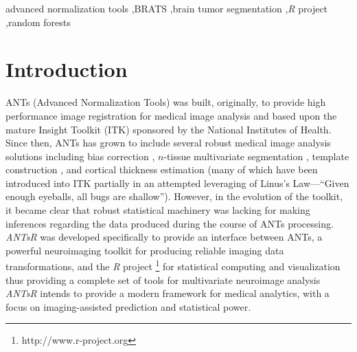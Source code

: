\documentclass[final,5p,times,twocolumn]{elsarticle}
\begin{document}
\begin{frontmatter}
\begin{keyword}
advanced normalization tools \sep BRATS \sep brain tumor segmentation \sep \textit{R} project \sep random forests
\end{keyword}

\end{frontmatter}

%
%
\newpage







%
%
%

\section{Introduction}

ANTs (Advanced Normalization Tools) was built, originally, to provide 
high performance image registration for medical image analysis
\citep{avants2008a} and based upon the mature Insight Toolkit (ITK)
sponsored by the National Institutes of Health.  Since then, ANTs has grown to include 
several robust medical image analysis solutions including bias 
correction \citep{tustison2010}, $n$-tissue multivariate segmentation 
\citep{avants2011}, template construction \citep{avants2010}, and cortical 
thickness estimation \citep{das2009} (many of which have been
introduced into ITK partially in an attempted leveraging of Linus's Law---``Given enough eyeballs, all bugs are shallow'').  
However, in the evolution of the toolkit, it became clear 
that robust statistical machinery was lacking for making inferences regarding
the data produced during the course of ANTs processing.  \textit{ANTsR} was developed
specifically to provide an interface between ANTs, a 
powerful neuroimaging toolkit for producing reliable imaging data 
transformations, and the \textit{R} project%
\footnote{
http://www.r-project.org
}
for statistical computing and visualization thus providing a complete
set of tools for multivariate neuroimage analysis \textit{ANTsR} intends to provide a modern framework for medical analytics, with a focus on imaging-assisted prediction and statistical power.
\end{document}
